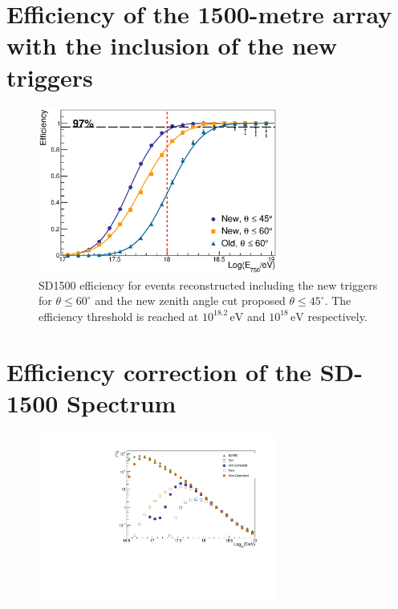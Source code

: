 \documentclass[12pt,a4paper]{article}
\newcommand{\eV}{\, \mathrm{eV}}
\begin{document}
\section{Efficiency of the 1500-metre array with the inclusion of the new triggers}
\label{sec:new}

\begin{figure}[h]
\begin{center}
\includegraphics[width=0.7\textwidth]{plots/NewCut.eps}
\caption{SD1500 efficiency for events reconstructed including the new triggers for $\theta\leq60^\circ$ and the new zenith angle cut proposed $\theta\leq45^\circ$. The efficiency threshold is reached at $10^{18.2}\eV$ and $10^{18}\eV$ respectively.
\label{fig:NewCut}}
\end{center}
\end{figure}


\section{Efficiency correction of the SD-1500 Spectrum}
\label{sec:spectrum}

\begin{figure}[hb]
\begin{center}
\includegraphics[width=0.7\textwidth]{plots/spectrum.pdf}
\caption{
\label{fig:flux}}
\end{center}
\end{figure}
\end{document}
